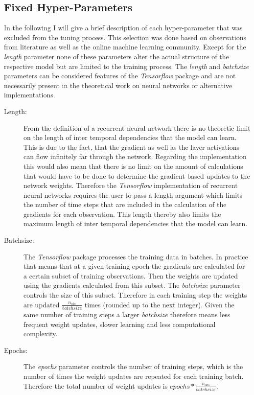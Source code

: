 \subsection{Fixed Hyper-Parameters}
In the following I will give a brief description of each hyper-parameter that was excluded from the tuning process. This selection was done based on observations from literature as well as the online machine learning community. Except for the \textit{length} parameter none of these parameters alter the actual structure of the respective model but are limited to the training process. The \textit{length} and \textit{batchsize} parameters can be considered features of the \textit{Tensorflow} package and are not necessarily present in the theoretical work on neural networks or alternative implementations.
\begin{description}
\item[Length:] From the definition of a recurrent neural network there is no theoretic limit on the length of inter temporal dependencies that the model can learn. This is due to the fact, that the gradient as well as the layer activations can flow infinitely far through the network. Regarding the implementation this would also mean that there is no limit on the amount of calculations that would have to be done to determine the gradient based updates to the network weights. Therefore the \textit{Tensorflow} implementation of recurrent neural networks requires the user to pass a length argument which limits the number of time steps that are included in the calculation of the gradients for each observation. This length thereby also limits the maximum length of inter temporal dependencies that the model can learn.

\item[Batchsize:] The \textit{Tensorflow} package processes the training data in batches. In practice that means that at a given training epoch the gradients are calculated for a certain subset of training observations. Then the weights are updated using the gradients calculated from this subset. The \textit{batchsize} parameter controls the size of this subset. Therefore in each training step the weights are updated $\frac{n_{obs}}{batchsize}$ times (rounded up to the next integer). Given the same number of training steps a larger \textit{batchsize} therefore means less frequent weight updates, slower learning and less computational complexity.

\item[Epochs:] The \textit{epochs} parameter controls the number of training steps, which is the number of times the weight updates are repeated for each training batch. Therefore the total number of weight updates is $epochs * \frac{n_{obs}}{batchsize}$. 


\end{description}
